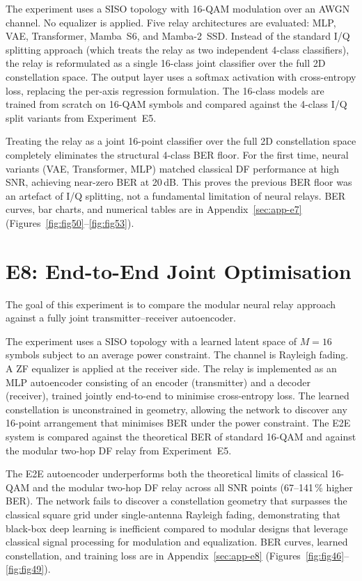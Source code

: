 The experiment uses a SISO topology with 16-QAM modulation over an AWGN channel. No
equalizer is applied. Five relay architectures are evaluated: MLP, VAE, Transformer,
Mamba~S6, and Mamba-2~SSD. Instead of the standard I/Q splitting approach (which
treats the relay as two independent 4-class classifiers), the relay is reformulated as
a single 16-class joint classifier over the full 2D constellation space. The output
layer uses a softmax activation with cross-entropy loss, replacing the per-axis
regression formulation. The 16-class models are trained from scratch on 16-QAM symbols
and compared against the 4-class I/Q split variants from Experiment~E5.

Treating the relay as a joint 16-point classifier over the full 2D constellation space
completely eliminates the structural 4-class BER floor. For the first time, neural
variants (VAE, Transformer, MLP) matched classical DF performance at high SNR,
achieving near-zero BER at 20\,dB. This proves the previous BER floor was an artefact
of I/Q splitting, not a fundamental limitation of neural relays.
BER curves, bar charts, and numerical tables are in Appendix~\ref{sec:app-e7}
(Figures~\ref{fig:fig50}--\ref{fig:fig53}).

\section{E8: End-to-End Joint Optimisation}\label{sec:end-to-end-joint-optimization}

The goal of this experiment is to compare the modular neural relay approach against a
fully joint transmitter--receiver autoencoder.

The experiment uses a SISO topology with a learned latent space of $M{=}16$ symbols
subject to an average power constraint. The channel is Rayleigh fading. A ZF equalizer
is applied at the receiver side. The relay is implemented as an MLP autoencoder
consisting of an encoder (transmitter) and a decoder (receiver), trained jointly
end-to-end to minimise cross-entropy loss. The learned constellation is unconstrained
in geometry, allowing the network to discover any 16-point arrangement that minimises
BER under the power constraint. The E2E system is compared against the theoretical BER
of standard 16-QAM and against the modular two-hop DF relay from Experiment~E5.

The E2E autoencoder underperforms both the theoretical limits of classical 16-QAM and
the modular two-hop DF relay across all SNR points (67--141\,\% higher BER). The
network fails to discover a constellation geometry that surpasses the classical square
grid under single-antenna Rayleigh fading, demonstrating that black-box deep learning
is inefficient compared to modular designs that leverage classical signal processing for
modulation and equalization.
BER curves, learned constellation, and training loss are in Appendix~\ref{sec:app-e8}
(Figures~\ref{fig:fig46}--\ref{fig:fig49}).